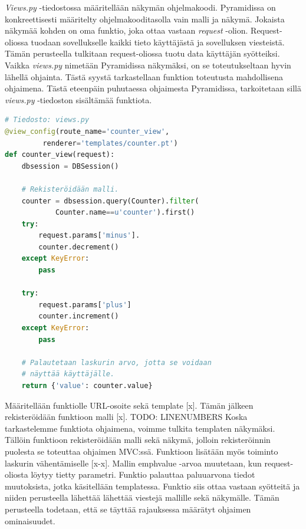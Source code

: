 \documentclass[finnish,utf8,nonumbib,palatino,kandi]{gradu2}
\begin{document}
\emph{Views.py} -tiedostossa määritellään näkymän ohjelmakoodi. Pyramidissa on konkreettisesti määritelty ohjelmakooditasolla vain malli ja näkymä.
Jokaista näkymää kohden on oma funktio, joka ottaa vastaan \emph{request} -olion. Request-oliossa tuodaan sovellukselle kaikki tieto käyttäjästä ja sovelluksen viesteistä. Tämän perusteella tulkitaan request-oliossa tuotu data käyttäjän syötteiksi.
Vaikka \emph{views.py} nimetään Pyramidissa näkymäksi, on se toteutukseltaan hyvin lähellä ohjainta. Tästä syystä tarkastellaan funktion toteutusta mahdollisena ohjaimena. Tästä eteenpäin puhutaessa ohjaimesta Pyramidissa, tarkoitetaan sillä \emph{views.py} -tiedoston sisältämää funktiota.

\begin{lstlisting}[language=Python]
# Tiedosto: views.py
@view_config(route_name='counter_view',
		 renderer='templates/counter.pt')
def counter_view(request):
    dbsession = DBSession()

    # Rekisteröidään malli.
    counter = dbsession.query(Counter).filter(
			Counter.name==u'counter').first()
    try:
        request.params['minus'].
        counter.decrement()
    except KeyError:
        pass

    try:
        request.params['plus']
        counter.increment()
    except KeyError:
        pass

    # Palautetaan laskurin arvo, jotta se voidaan 
    # näyttää käyttäjälle.
    return {'value': counter.value}
\end{lstlisting}

Määritellään funktiolle URL-osoite sekä template [x]. Tämän jälkeen rekisteröidään funktioon malli [x]. TODO: LINENUMBERS Koska tarkastelemme funktiota ohjaimena, voimme tulkita templaten näkymäksi. Tällöin funktioon rekisteröidään malli sekä näkymä, jolloin rekisteröinnin puolesta se toteuttaa ohjaimen MVC:ssä.
Funktioon lisätään myös toiminto laskurin vähentämiselle [x-x]. Mallin emph{value} -arvoa muutetaan, kun request-oliosta löytyy tietty parametri. Funktio palauttaa paluuarvona tiedot muutoksista, jotka käsitellään templatessa. Funktio siis ottaa vastaan syötteitä ja niiden perusteella lähettää lähettää viestejä
mallille sekä näkymälle. Tämän perusteella todetaan, että se täyttää rajauksessa määrätyt ohjaimen ominaisuudet. \\
\end{document}
